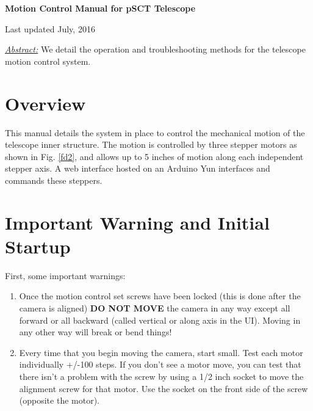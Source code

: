 \documentclass[11pt]{article}
\begin{document}
\begin{center}
{\bf{\huge{Motion Control Manual for pSCT Telescope}}}

\vspace{0.1in}
Last updated July, 2016

\vspace{0.3in}
{\it{\underline{Abstract:}}} We detail the operation and troubleshooting methods for the telescope motion control system.

\end{center}

\tableofcontents

\vspace{0.2in}


\section{Overview}

This manual details the system in place to control the mechanical motion of the telescope inner structure.
The motion is controlled by three stepper motors as shown in Fig. \ref{fd2}, and allows up to 5 inches of motion along each independent stepper axis. 
A web interface hosted on an Arduino Yun interfaces and commands these steppers.


\section{Important Warning and Initial Startup}

First, some important warnings:
\begin{enumerate}
	\item Once the motion control set screws have been locked (this is done after the camera is aligned) {\bf DO NOT MOVE} the camera in any way except all forward or all backward (called vertical or along axis in the UI).
	Moving in any other way will break or bend things!
	\item Every time that you begin moving the camera, start small.  Test each motor individually +/-100 steps.  
		If you don't see a motor move, you can test that there isn't a problem with the screw by using a 1/2 inch socket to move the alignment screw for that motor.
		Use the socket on the front side of the screw (opposite the motor).
\end{enumerate}
\end{document}
